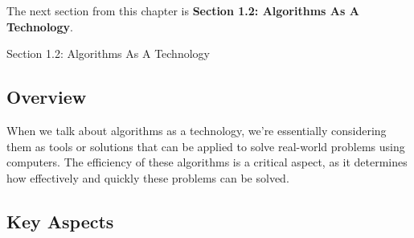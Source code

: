 The next section from this chapter is \textbf{Section 1.2: Algorithms As A Technology}.

\begin{notes}{Section 1.2: Algorithms As A Technology}
    \subsection*{Overview}

    When we talk about algorithms as a technology, we're essentially considering them as tools or solutions that can be applied to solve real-world problems using computers. The efficiency of these 
    algorithms is a critical aspect, as it determines how effectively and quickly these problems can be solved. \vspace*{1em}

    \subsection*{Key Aspects}


\end{notes}
